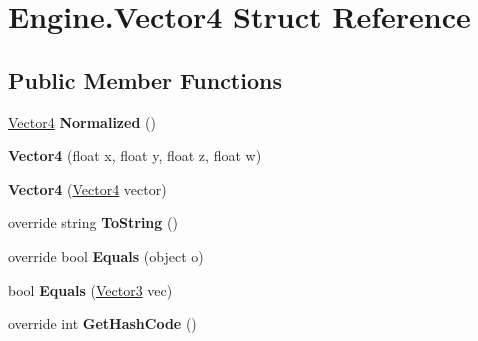 \hypertarget{struct_engine_1_1_vector4}{\section{Engine.\-Vector4 Struct Reference}
\label{struct_engine_1_1_vector4}
}
\subsection*{Public Member Functions}
\begin{DoxyCompactItemize}
\item 
\hypertarget{struct_engine_1_1_vector4_ae78c86b7afdb679af0f1ddcec7a77f2b}{\hyperlink{struct_engine_1_1_vector4}{Vector4} {\bfseries Normalized} ()}\label{struct_engine_1_1_vector4_ae78c86b7afdb679af0f1ddcec7a77f2b}

\item 
\hypertarget{struct_engine_1_1_vector4_a611eee8cacd83862d55d8703934c1c1c}{{\bfseries Vector4} (float x, float y, float z, float w)}\label{struct_engine_1_1_vector4_a611eee8cacd83862d55d8703934c1c1c}

\item 
\hypertarget{struct_engine_1_1_vector4_a5c84bc823c42f6aa17b6ad0732f3a12e}{{\bfseries Vector4} (\hyperlink{struct_engine_1_1_vector4}{Vector4} vector)}\label{struct_engine_1_1_vector4_a5c84bc823c42f6aa17b6ad0732f3a12e}

\item 
\hypertarget{struct_engine_1_1_vector4_a72c1681b9d8e81e24f83f863bf4a1f3f}{override string {\bfseries To\-String} ()}\label{struct_engine_1_1_vector4_a72c1681b9d8e81e24f83f863bf4a1f3f}

\item 
\hypertarget{struct_engine_1_1_vector4_a66452468f1f9aa74b520dc7a1648ad20}{override bool {\bfseries Equals} (object o)}\label{struct_engine_1_1_vector4_a66452468f1f9aa74b520dc7a1648ad20}

\item 
\hypertarget{struct_engine_1_1_vector4_aae92825ae1b02c2cb24ae6f4967d928c}{bool {\bfseries Equals} (\hyperlink{struct_engine_1_1_vector3}{Vector3} vec)}\label{struct_engine_1_1_vector4_aae92825ae1b02c2cb24ae6f4967d928c}

\item 
\hypertarget{struct_engine_1_1_vector4_aa4f8a0b669e9215d0984433633605937}{override int {\bfseries Get\-Hash\-Code} ()}\label{struct_engine_1_1_vector4_aa4f8a0b669e9215d0984433633605937}


\end{DoxyCompactItemize}
